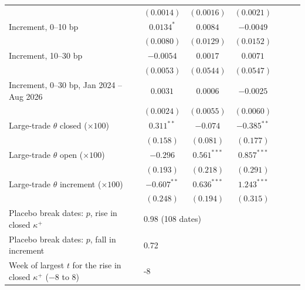 \begin{tabular}{lcccccc}
 & $(0.0014)$ & $(0.0016)$ & $(0.0021)$ & & & \\
Increment, 0--10 bp & $0.0134^{*}$ & $0.0084$ & $-0.0049$ & & & \\
 & $(0.0080)$ & $(0.0129)$ & $(0.0152)$ & & & \\
Increment, 10--30 bp & $-0.0054$ & $0.0017$ & $0.0071$ & & & \\
 & $(0.0053)$ & $(0.0544)$ & $(0.0547)$ & & & \\
Increment, 0--30 bp, Jan 2024 -- Aug 2026 & $0.0031$ & $0.0006$ & $-0.0025$ & & & \\
 & $(0.0024)$ & $(0.0055)$ & $(0.0060)$ & & & \\
Large-trade $\theta$ closed ($\times100$) & $0.311^{**}$ & $-0.074$ & $-0.385^{**}$ & & & \\
 & $(0.158)$ & $(0.081)$ & $(0.177)$ & & & \\
Large-trade $\theta$ open ($\times100$) & $-0.296$ & $0.561^{***}$ & $0.857^{***}$ & & & \\
 & $(0.193)$ & $(0.218)$ & $(0.291)$ & & & \\
Large-trade $\theta$ increment ($\times100$) & $-0.607^{**}$ & $0.636^{***}$ & $1.243^{***}$ & & & \\
 & $(0.248)$ & $(0.194)$ & $(0.315)$ & & & \\
Placebo break dates: $p$, rise in closed $\kappa^+$ & \multicolumn{3}{l}{0.98 (108 dates)} & & & \\
Placebo break dates: $p$, fall in increment & \multicolumn{3}{l}{0.72} & & & \\
Week of largest $t$ for the rise in closed $\kappa^+$ ($-8$ to $8$) & \multicolumn{3}{l}{-8} & & & \\
\bottomrule
\end{tabular}
